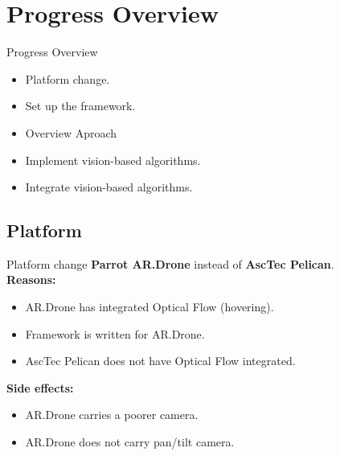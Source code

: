 \documentclass{beamer}
\begin{document}

\section{Progress Overview}
\begin{frame}{Progress Overview}
\begin{itemize}
\item Platform change.
\item Set up the framework.
\item Overview Aproach
\item Implement vision-based algorithms.
\item Integrate vision-based algorithms.
\end{itemize}
\end{frame}

\subsection{Platform}
\begin{frame}{Platform change}
\textbf{Parrot AR.Drone} instead of \textbf{AscTec Pelican}.\\
\vspace{0.2cm}
\textbf{Reasons:}
\begin{itemize}
\item AR.Drone has integrated Optical Flow (hovering).
\item Framework is written for AR.Drone.
\item AscTec Pelican does not have Optical Flow integrated.
\end{itemize}
\textbf{Side effects:}
\begin{itemize}
\item AR.Drone carries a poorer camera.
\item AR.Drone does not carry pan/tilt camera.
\end{itemize}
\end{frame}
\end{document}
